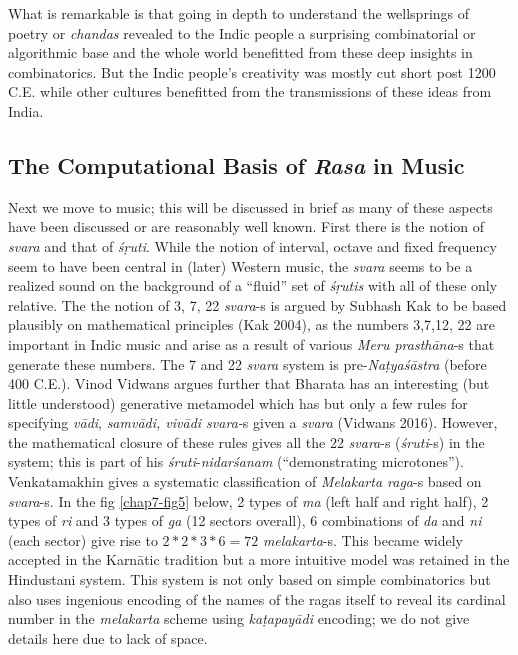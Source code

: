 What is remarkable is that going in depth to understand the wellsprings of poetry or \textsl{chandas} revealed to the Indic people a surprising combinatorial or algorithmic base and the whole world benefitted from these deep insights in combinatorics. But the Indic people’s creativity was mostly cut short post 1200 C.E. while other cultures benefitted from the transmissions of these ideas from India.

\subsection{The Computational Basis of \textsl{Rasa} in Music}\label{chap7-sec5.2}

Next we move to music; this will be discussed in brief as many of these aspects have been discussed or are reasonably well known. First there is the notion of \textsl{svara} and that of \textsl{śṛuti}. While the notion of interval, octave and fixed frequency seem to have been central in (later) Western music, the \textsl{svara} seems to be a realized sound on the background of a “fluid” set of \textsl{śṛutis} with all of these only relative. The the notion of 3, 7, 22 \textsl{svara}-s is argued by Subhash Kak to be based plausibly on mathematical principles (Kak 2004), as the numbers 3,7,12, 22 are important in Indic music and arise as a result of various \textsl{Meru prasthāna}-s that generate these numbers. The 7 and 22 \textsl{svara} system is pre-\textsl{Naṭyaśāstra} (before 400 C.E.). Vinod Vidwans argues further that Bharata has an interesting (but little understood) generative metamodel which has but only a few rules for specifying \textsl{vādi}, \textsl{samvādi, vivādi svara-}s given a \textsl{svara} (Vidwans 2016). However, the mathematical closure of these rules gives all the 22 \textsl{svara}-s (\textsl{śruti}-s) in the system; this is part of his \textsl{śruti}-\textsl{nidarśanam} (“demonstrating microtones”). Venkatamakhin gives a systematic classification of \textsl{Melakarta raga}-s based on \textsl{svara}-s. In the fig \ref{chap7-fig5} below, 2 types of \textsl{ma} (left half and right half), 2 types of \textsl{ri} and 3 types of \textsl{ga} (12 sectors overall), 6 combinations of \textsl{da} and \textsl{ni} (each sector) give rise to $2*2*3*6=72$ \textsl{melakarta}-s. This became widely accepted in the Karnātic tradition but a more intuitive model was retained in the Hindustani system. This system is not only based on simple combinatorics but also uses ingenious encoding of the names of the ragas itself to reveal its cardinal number in the \textsl{melakarta} scheme using \textsl{kaṭapayādi} encoding; we do not give details here due to lack of space.

